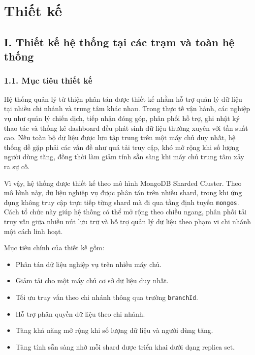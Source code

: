 \documentclass[12pt,a4paper]{article}
\begin{document}
\section{Thiết kế}

\subsection*{I. Thiết kế hệ thống tại các trạm và toàn hệ thống}

\subsubsection*{1.1. Mục tiêu thiết kế}

Hệ thống quản lý từ thiện phân tán được thiết kế nhằm hỗ trợ quản lý dữ liệu tại nhiều chi nhánh và trung tâm khác nhau. Trong thực tế vận hành, các nghiệp vụ như quản lý chiến dịch, tiếp nhận đóng góp, phân phối hỗ trợ, ghi nhật ký thao tác và thống kê dashboard đều phát sinh dữ liệu thường xuyên với tần suất cao. Nếu toàn bộ dữ liệu được lưu tập trung trên một máy chủ duy nhất, hệ thống dễ gặp phải các vấn đề như quá tải truy cập, khó mở rộng khi số lượng người dùng tăng, đồng thời làm giảm tính sẵn sàng khi máy chủ trung tâm xảy ra sự cố.

Vì vậy, hệ thống được thiết kế theo mô hình MongoDB Sharded Cluster. Theo mô hình này, dữ liệu nghiệp vụ được phân tán trên nhiều shard, trong khi ứng dụng không truy cập trực tiếp từng shard mà đi qua tầng định tuyến \texttt{mongos}. Cách tổ chức này giúp hệ thống có thể mở rộng theo chiều ngang, phân phối tải truy vấn giữa nhiều nút lưu trữ và hỗ trợ quản lý dữ liệu theo phạm vi chi nhánh một cách linh hoạt.

Mục tiêu chính của thiết kế gồm:

\begin{itemize}
    \item Phân tán dữ liệu nghiệp vụ trên nhiều máy chủ.
    \item Giảm tải cho một máy chủ cơ sở dữ liệu duy nhất.
    \item Tối ưu truy vấn theo chi nhánh thông qua trường \texttt{branchId}.
    \item Hỗ trợ phân quyền dữ liệu theo chi nhánh.
    \item Tăng khả năng mở rộng khi số lượng dữ liệu và người dùng tăng.
    \item Tăng tính sẵn sàng nhờ mỗi shard được triển khai dưới dạng replica set.
\end{itemize}
\end{document}
